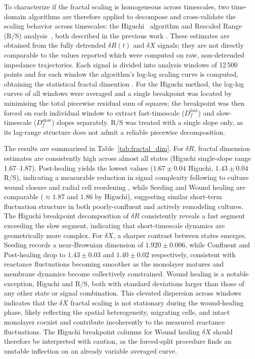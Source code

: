 \documentclass[english, 10pt, a4paper]{article}
\begin{document}
To characterize if the fractal scaling is homogeneous across timescales, two time-domain algorithms are therefore applied to decompose and cross-validate the scaling behavior across timescales: the Higuchi~\cite{higuchi1988approach, nobukawa2019atypical} algorithm and Rescaled Range (R/S) analysis~\cite{feder1988fractalChapter8, lloyd1966long, RSrepository}, both described in the previous work \cite{acerbo2024determining}. These estimates are obtained from the fully detrended $\delta R(t)$ and $\delta X$ signals; they are not directly comparable to the values reported which were computed on raw, non-detrended impedance trajectories. Each signal is divided into analysis windows of 12\,500 points and for each window the algorithm's log-log scaling curve is computed, obtaining the statistical fractal dimention \cite{guyonnet2019statistics, brewer2006limitations}. For the Higuchi method, the log-log curves of all windows were averaged and a single breakpoint was located by minimising the total piecewise residual sum of squares; the breakpoint was then forced on each individual window to extract fast-timescale ($D_f^\text{fast}$) and slow-timescale ($D_f^\text{slow}$) slopes separately. R/S was treated with a single slope only, as its lag-range structure does not admit a reliable piecewise decomposition.

The results are summarised in Table~\ref{tab:fractal_dim}. For $\delta R$, fractal dimension estimates are consistently high across almost all states (Higuchi single-slope range 1.67–1.87). Post-healing yields the lowest values ($1.67 \pm 0.04$ Higuchi, $1.43 \pm 0.04$ R/S), indicating a measurable reduction in signal complexity following to culture wound closure and radial cell reordening \cite{gamal2015real}, while Seeding and Wound healing are comparable ($\approx 1.87$ and $1.86$ by Higuchi), suggesting similar short-term fluctuation structure in both poorly-confluent and actively remodeling cultures. The Higuchi breakpoint decomposition of $\delta R$ consistently reveals a fast segment exceeding the slow segment, indicating that short-timescale dynamics are geometrically more complex. For $\delta X$, a sharper contrast between states emerges. Seeding records a near-Brownian dimension of $1.920 \pm 0.006$, while Confluent and Post-healing drop to $1.43 \pm 0.03$ and $1.40 \pm 0.02$ respectively, consistent with reactance fluctuations becoming smoother as the monolayer matures and membrane dynamics become collectively constrained. Wound healing is a notable exception, Higuchi and R/S, both with standard deviations larger than those of any other state or signal combination. This elevated dispersion across windows indicates that the $\delta X$ fractal scaling is not stationary during the wound-healing phase, likely reflecting the spatial heterogeneity, migrating cells, and intact monolayer coexist and contribute incoherently to the measured reactance fluctuations. The Higuchi breakpoint columns for Wound healing $\delta X$ should therefore be interpreted with caution, as the forced-split procedure finds an unstable inflection on an already variable averaged curve. 
 
\end{document}
